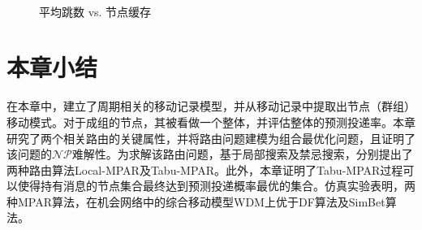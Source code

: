 \begin{figure}[htbp]
\centering
{}\quad\quad
{} \\
\quad\quad
{}
\caption{平均跳数 vs. 节点缓存}
\label{fig:chap3_hop_buffer}
\end{figure}



\section{本章小结}
\label{chap3:本章总结}
在本章中，建立了周期相关的移动记录模型，并从移动记录中提取出节点（群组）移动模式。对于成组的节点，其被看做一个整体，并评估整体的预测投递率。本章研究了两个相关路由的关键属性，并将路由问题建模为组合最优化问题，且证明了该问题的$\mathcal{NP}$难解性。为求解该路由问题，基于局部搜索及禁忌搜索，分别提出了两种路由算法Local-MPAR及Tabu-MPAR。此外，本章证明了Tabu-MPAR过程可以使得持有消息的节点集合最终达到预测投递概率最优的集合。仿真实验表明，两种MPAR算法，在机会网络中的综合移动模型WDM上优于DF算法及SimBet算法。

~\\
~\\
~\\
~\\
~\\
~\\
~\\
~\\
~\\
~\\


